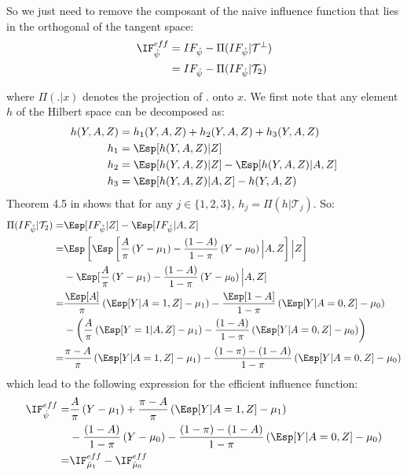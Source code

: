 \documentclass[12pt]{article}
\newcommand\Tspace{\mathcal{T}}
\begin{document}
So we just need to remove the composant of the naive influence
function that lies in the orthogonal of the tangent space:
\begin{align*}
\IF^{eff}_{\hat{\psi}} &= IF_{\hat{\psi}} - \Pi(IF_{\hat{\psi}}|\Tspace^{\perp}) \\
&= IF_{\hat{\psi}} - \Pi(IF_{\hat{\psi}}|\Tspace_2) 
\end{align*}



where \(\Pi(.|x)\) denotes the projection of \(.\) onto \(x\). We
first note that any element \(h\) of
the Hilbert space can be decomposed as:
\begin{align*}
h(Y,A,Z) &= h_1(Y,A,Z) + h_2(Y,A,Z) + h_3(Y,A,Z) \\
h_1 &= \Esp[h(Y,A,Z)|Z] \\
h_2 &= \Esp[h(Y,A,Z)|Z] - \Esp[h(Y,A,Z)|A,Z] \\
h_3 &= \Esp[h(Y,A,Z)|A,Z] - h(Y,A,Z)
\end{align*}
Theorem 4.5 in \cite{tsiatis2007semiparametric} shows that for any \(j
\in \{1,2,3\}\), \(h_j=\Pi(h|\Tspace_j)\). So:
\begin{align*}
\Pi(IF_{\hat{\psi}}|\Tspace_2) =& \Esp[IF_{\hat{\psi}}|Z] - \Esp[IF_{\hat{\psi}}|A,Z] \\
=& \Esp\left[\Esp\left[\frac{A}{\pi} \left(Y - \mu_1\right) - \frac{(1-A)}{1-\pi}\left(Y - \mu_0\right) \Big| A,Z\right] \Big| Z\right] \\
&- \Esp[\frac{A}{\pi} \left(Y - \mu_1\right) - \frac{(1-A)}{1-\pi}\left(Y - \mu_0\right) \Big| A,Z] \\
=& \frac{\Esp[A]}{\pi} \left(\Esp[Y|A=1,Z] - \mu_1\right) - \frac{\Esp[1-A]}{1-\pi}\left(\Esp[Y|A=0,Z] - \mu_0\right) \\
&- \left( \frac{A}{\pi} \left(\Esp[Y=1|A,Z] - \mu_1\right) - \frac{(1-A)}{1-\pi}\left(\Esp[Y|A=0,Z] - \mu_0\right)\right)  \\
=& \frac{\pi-A}{\pi} \left(\Esp[Y|A=1,Z] - \mu_1\right) - \frac{(1-\pi) - (1-A)}{1-\pi}\left(\Esp[Y|A=0,Z] - \mu_0\right) 
\end{align*}
which lead to the following expression for the efficient influence function:
\begin{align*}
\IF^{eff}_{\hat{\psi}} =& \frac{A}{\pi} \left(Y - \mu_1\right) + \frac{\pi-A}{\pi} \left(\Esp[Y|A=1,Z] - \mu_1\right) \\
&- \frac{(1-A)}{1-\pi}\left(Y - \mu_0\right) - \frac{(1-\pi) - (1-A)}{1-\pi}\left(\Esp[Y|A=0,Z] - \mu_0\right)  \\
=& \IF^{eff}_{\hat{\mu}_1} - \IF^{eff}_{\hat{\mu}_0}
\end{align*}
\end{document}
